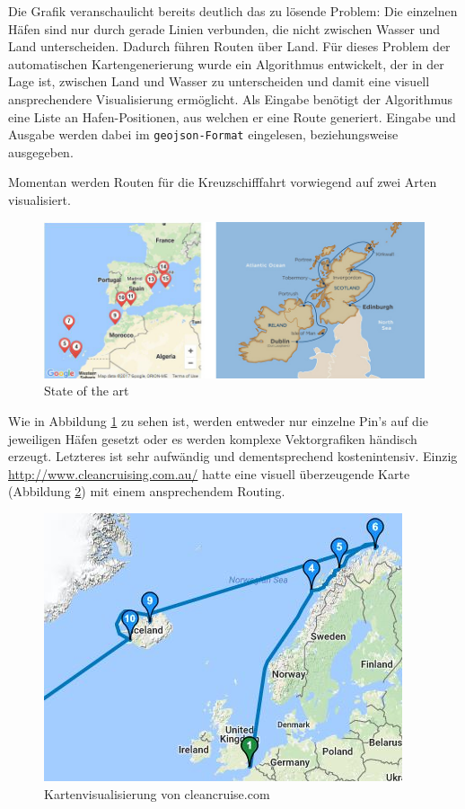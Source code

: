 \documentclass[letterpaper]{article}
\begin{document}
	Die Grafik veranschaulicht bereits deutlich das zu lösende Problem: Die einzelnen Häfen sind nur durch gerade Linien verbunden, die nicht zwischen Wasser und Land unterscheiden. Dadurch führen Routen über Land. Für dieses Problem der automatischen Kartengenerierung wurde ein Algorithmus entwickelt, der in der Lage ist, zwischen Land und Wasser zu unterscheiden und damit eine visuell ansprechendere Visualisierung ermöglicht. Als Eingabe benötigt der Algorithmus eine Liste an Hafen-Positionen, aus welchen er eine Route generiert. Eingabe und Ausgabe werden dabei im \texttt{geojson-Format} \cite{rfc7946} eingelesen, beziehungsweise ausgegeben.

	Momentan werden Routen für die Kreuzschifffahrt vorwiegend auf zwei Arten visualisiert.

	\begin{figure}[!htb]
		\begin{center}
		\includegraphics[width=\linewidth]{state_of_the_art}
		\caption{State of the art}
		\label{fig:state of the art}
		\end{center}
	\end{figure}

	Wie in Abbildung \ref{fig:state of the art} zu sehen ist, werden entweder nur einzelne Pin's auf die jeweiligen Häfen gesetzt oder es werden komplexe Vektorgrafiken händisch erzeugt. Letzteres ist sehr aufwändig und dementsprechend kostenintensiv. Einzig \url{http://www.cleancruising.com.au/} hatte eine visuell überzeugende Karte (Abbildung \ref{fig:state of the art cleancruise}) mit einem ansprechendem Routing. 

	\begin{figure}[!htb]
		\begin{center}
		\includegraphics[width=.6\linewidth]{state_of_the_art_cleancruise}
		\caption{Kartenvisualisierung von cleancruise.com}
		\label{fig:state of the art cleancruise}
		\end{center}
	\end{figure}
\end{document}
